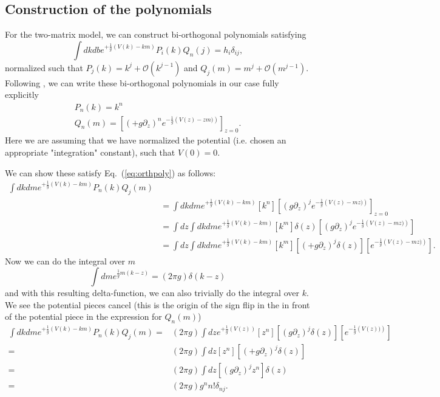 \documentclass[english]{article}
\let\mc=\mathcal
\begin{document}
\subsection{Construction of the polynomials}

For the two-matrix model, we can construct bi-orthogonal polynomials satisfying 
\begin{equation} \label{eq:orthpoly}
    \int dk db e^{+\frac{1}{g}\left( V(k)-km \right)} P_{i}(k) Q_{n}(j) = h_{i} \delta_{i j },
\end{equation}
normalized such that $P_j(k) = k^{j}+ \mc{O}(k^{j-1})$ and $Q_{j}(m)=m^j+ \mc{O}(m^{j-1})$. 
Following \cite{Hashimoto_2005}, we can write these bi-orthogonal polynomials in our case fully explicitly
\begin{align}
     P_{n}(k)=k^{n}\\
    Q_{n}(m)=[(+g \partial_{z})^{n} e^{-\frac{1}{g}\left( V(z)-zm)\right)}]_{z=0}.
\end{align}
Here we are assuming that we have normalized the potential (i.e. chosen an appropriate "integration" constant), such that $V(0)=0$.

We can show these satisfy Eq.~(\ref{eq:orthpoly}) as follows:
\begin{align}
     \int dk dm e^{+\frac{1}{g}\left( V(k)-km \right)} P_{n}(k) Q_{j}(m) \\
     & = \int dk dm e^{+\frac{1}{g}\left( V(k)-km \right)} [k^n][(g \partial_{z})^{j} e^{-\frac{1}{g}\left( V(z)-mz)\right)}]_{z=0}\\
     & = \int dz \int dk dm e^{+\frac{1}{g}\left( V(k)-km \right)} [k^m]\delta(z) [(g \partial_{z})^{j} e^{-\frac{1}{g}\left( V(z)-mz)\right)}] \\
     & = \int dz \int dk dm e^{+\frac{1}{g}\left( V(k)-km \right)} [k^m] [(+g \partial_{z})^{j} \delta(z)] [e^{-\frac{1}{g}\left( V(z)-mz)\right)}].
\end{align}
Now we can do the integral over $m$
\begin{equation}
    \int dm e^{\frac{1}{g}m(k-z)}= (2 \pi g ) \delta(k-z)
\end{equation}
and with this resulting delta-function, we can also trivially do the integral over $k$. We see the potential pieces cancel (this is the origin of the sign flip in the in front of the potential piece in the expression for $Q_{n}(m)$)
\begin{align}
     \int dk dm e^{+\frac{1}{g}\left( V(k)-km \right)} P_{n}(k) Q_{j}(m)  = & (2\pi g) \int dz e^{+\frac{1}{g}\left( V(z) \right)} [z^n] [(g \partial_{z})^{j} \delta(z)] [e^{-\frac{1}{g}\left( V(z))\right)}] \\
     =  & (2\pi g) \int dz  [z^n] [(+g \partial_{z})^{j} \delta(z)]\\
     = & (2 \pi g) \int dz [(g \partial_{z})^{j} z^{n}] \delta(z) \\
     = & (2 \pi g) g^{n} n! \delta_{n j}.
\end{align}
\end{document}
